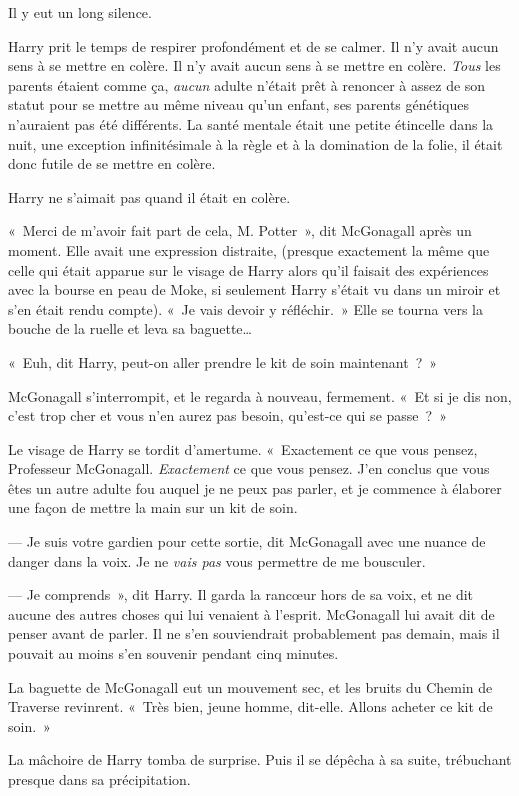 Il y eut un long silence.

Harry prit le temps de respirer profondément et de se calmer. Il n'y avait aucun sens à se mettre en colère. Il n'y avait aucun sens à se mettre en colère. \emph{Tous} les parents étaient comme ça, \emph{aucun} adulte n'était prêt à renoncer à assez de son statut pour se mettre au même niveau qu'un enfant, ses parents génétiques n'auraient pas été différents. La santé mentale était une petite étincelle dans la nuit, une exception infinitésimale à la règle et à la domination de la folie, il était donc futile de se mettre en colère.

Harry ne s'aimait pas quand il était en colère.

«~Merci de m'avoir fait part de cela, M. Potter~», dit McGonagall après un moment. Elle avait une expression distraite, (presque exactement la même que celle qui était apparue sur le visage de Harry alors qu'il faisait des expériences avec la bourse en peau de Moke, si seulement Harry s'était vu dans un miroir et s'en était rendu compte). «~Je vais devoir y réfléchir.~» Elle se tourna vers la bouche de la ruelle et leva sa baguette…

«~Euh, dit Harry, peut-on aller prendre le kit de soin maintenant~?~»

McGonagall s'interrompit, et le regarda à nouveau, fermement. «~Et si je dis non, c'est trop cher et vous n'en aurez pas besoin, qu'est-ce qui se passe~?~»

Le visage de Harry se tordit d'amertume.
«~Exactement ce que vous pensez, Professeur McGonagall. \emph{Exactement} ce que vous pensez. J'en conclus que vous êtes un autre adulte fou auquel je ne peux pas parler, et je commence à élaborer une façon de mettre la main sur un kit de soin.

--- Je suis votre gardien pour cette sortie, dit McGonagall avec une nuance de danger dans la voix. Je ne \emph{vais pas} vous permettre de me bousculer.

--- Je comprends~», dit Harry. Il garda la rancœur hors de sa voix, et ne dit aucune des autres choses qui lui venaient à l'esprit. McGonagall lui avait dit de penser avant de parler. Il ne s'en souviendrait probablement pas demain, mais il pouvait au moins s'en souvenir pendant cinq minutes.

La baguette de McGonagall eut un mouvement sec, et les bruits du Chemin de Traverse revinrent. «~Très bien, jeune homme, dit-elle. Allons acheter ce kit de soin.~»

La mâchoire de Harry tomba de surprise. Puis il se dépêcha à sa suite, trébuchant presque dans sa précipitation.

